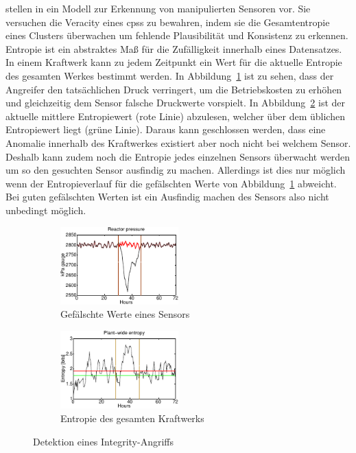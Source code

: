 \documentclass[final,bibliography=totocnumbered]{include/sikseminar}
\newcommand{\cps}{\glspl{cps}\xspace}
\begin{document}
    \citeauthor{KLG15} stellen in \cite{KLG15} ein Modell zur Erkennung von manipulierten Sensoren vor.
    Sie versuchen die Veracity eines \cps zu bewahren, indem sie die Gesamtentropie eines Clusters überwachen um fehlende Plausibilität und Konsistenz zu erkennen.
    Entropie ist ein abstraktes Maß für die Zufälligkeit innerhalb eines Datensatzes.
    In einem Kraftwerk kann zu jedem Zeitpunkt ein Wert für die aktuelle Entropie des gesamten Werkes bestimmt werden.
    In Abbildung~\ref{fig:spoof} ist zu sehen, dass der Angreifer den tatsächlichen Druck verringert, um die Betriebskosten zu erhöhen und gleichzeitig dem Sensor falsche Druckwerte vorspielt.
    In Abbildung~\ref{fig:entropy_success} ist der aktuelle mittlere Entropiewert (rote Linie) abzulesen, welcher über dem üblichen Entropiewert liegt (grüne Linie).
    Daraus kann geschlossen werden, dass eine Anomalie innerhalb des Kraftwerkes existiert aber noch nicht bei welchem Sensor.
    Deshalb kann zudem noch die Entropie jedes einzelnen Sensors überwacht werden um so den gesuchten Sensor ausfindig zu machen.
    Allerdings ist dies nur möglich wenn der Entropieverlauf für die gefälschten Werte von Abbildung~\ref{fig:spoof} abweicht.
    Bei guten gefälschten Werten ist ein Ausfindig machen des Sensors also nicht unbedingt möglich.

    \begin{figure}
        \centering
        \begin{subfigure}[t]{0.4\textwidth}
            \includegraphics[height=3cm]{entropy_a}
            \caption{Gefälschte Werte eines Sensors}
            \label{fig:spoof}
        \end{subfigure}
        \begin{subfigure}[t]{0.4\textwidth}
            \includegraphics[height=3cm]{entropy_b}
            \caption{Entropie des gesamten Kraftwerks}
            \label{fig:entropy_success}
        \end{subfigure}
        \caption{Detektion eines Integrity-Angriffs~\cite{KLG15}}
        \label{fig:entropie}
    \end{figure}
\end{document}
